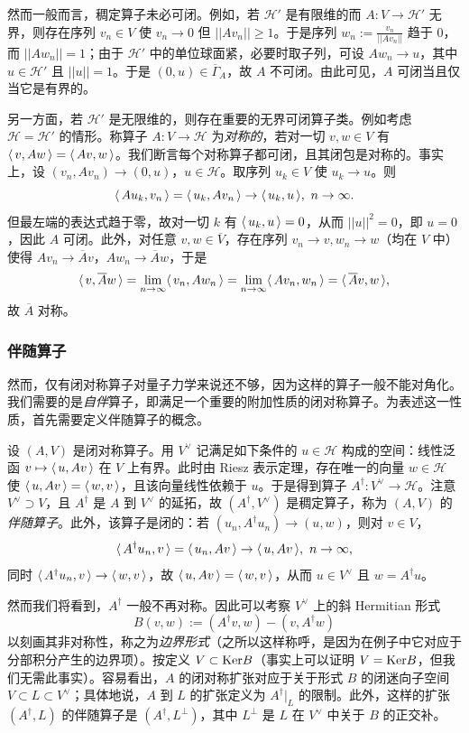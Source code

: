然而一般而言，稠定算子未必可闭。例如，若 $\mathcal H'$ 是有限维的而 $A: V\to \mathcal H'$ 无界，则存在序列 $v_n\in V$ 使 $v_n\to 0$ 但 $||Av_n||\ge 1$。于是序列 $w_n:=\frac{v_n}{||Av_n||}$ 趋于 $0$，而 $||Aw_n||=1$；由于 $\mathcal H'$ 中的单位球面紧，必要时取子列，可设 $Aw_n\to u$，其中 $u\in \mathcal H'$ 且 $||u||=1$。于是 $(0,u)\in \overline{\Gamma}_A$，故 $A$ 不可闭。由此可见，$A$ 可闭当且仅当它是有界的。

另一方面，若 $\mathcal H'$ 是无限维的，则存在重要的无界可闭算子类。例如考虑 $\mathcal H=\mathcal H'$ 的情形。称算子 $A: V\to \mathcal H$ 为\emph{对称的}，若对一切 $v,w\in V$ 有 $\langle\, v,Aw\,\rangle=\langle\, Av,w\,\rangle$。我们断言每个对称算子都可闭，且其闭包是对称的。事实上，设 $(v_n,Av_n)\to (0,u)$，$u\in\mathcal H$。取序列 $u_k\in V$ 使 $u_k\to u$。则
$$
\langle\, Au_k,v_n\,\rangle=\langle\, u_k,Av_n\,\rangle\to \langle\, u_k,u\,\rangle,\ n\to \infty.
$$
但最左端的表达式趋于零，故对一切 $k$ 有 $\langle\, u_k,u\,\rangle=0$，从而 $||u||^2=0$，即 $u=0$，因此 $A$ 可闭。此外，对任意 $v,w\in \overline V$，存在序列 $v_n\to v,w_n\to w$（均在 $V$ 中）使得 $Av_n\to \overline Av$，$Aw_n\to \overline Aw$，于是
$$
\langle\, v,\overline Aw\,\rangle=\lim_{n\to \infty}\langle\, v_n,Aw_n\,\rangle=\lim_{n\to \infty}\langle\, Av_n,w_n\,\rangle=\langle\, \overline Av,w\,\rangle,
$$
故 $\overline A$ 对称。

\subsubsection{伴随算子}
然而，仅有闭对称算子对量子力学来说还不够，因为这样的算子一般不能对角化。我们需要的是\emph{自伴}算子，即满足一个重要的附加性质的闭对称算子。为表述这一性质，首先需要定义伴随算子的概念。

设 $(A,V)$ 是闭对称算子。用 $V^\vee$ 记满足如下条件的 $u\in \mathcal H$ 构成的空间：线性泛函 $v\mapsto \langle\, u,Av\,\rangle$ 在 $V$ 上有界。此时由 Riesz 表示定理，存在唯一的向量 $w\in \mathcal H$ 使 $\langle\, u,Av\,\rangle=\langle\, w,v\,\rangle$，且该向量线性依赖于 $u$。于是得到算子 $A^\dagger: V^\vee\to \mathcal H$。注意 $V^\vee\supset V$，且 $A^\dagger$ 是 $A$ 到 $V^\vee$ 的延拓，故 $(A^\dagger,V^\vee)$ 是稠定算子，称为 $(A,V)$ 的\emph{伴随算子}。此外，该算子是闭的：若 $(u_n,A^\dagger u_n)\to (u,w)$，则对 $v\in V$，
$$
\langle\, A^\dagger u_n,v\,\rangle=\langle\, u_n,Av\,\rangle\to \langle\, u,Av\,\rangle,\ n\to \infty,
$$
同时 $\langle\, A^\dagger u_n,v\,\rangle\to \langle\, w,v\,\rangle$，故 $\langle\, u,Av\,\rangle=\langle\, w,v\,\rangle$，从而 $u\in V^\vee$ 且 $w=A^\dagger u$。

然而我们将看到，$A^\dagger$ 一般不再对称。因此可以考察 $V^\vee$ 上的斜 Hermitian 形式
$$
B(v,w):=(A^\dagger v,w)-(v,A^\dagger w)
$$
以刻画其非对称性，称之为\emph{边界形式}（之所以这样称呼，是因为在例子中它对应于分部积分产生的边界项）。按定义 $V\subset {\rm Ker}B$（事实上可以证明 $V={\rm Ker}B$，但我们无需此事实）。容易看出，$A$ 的闭对称扩张对应于关于形式 $B$ 的闭迷向子空间 $V\subset L\subset V^\vee$；具体地说，$A$ 到 $L$ 的扩张定义为 $A^\dagger|_L$ 的限制。此外，这样的扩张 $(A^\dagger,L)$ 的伴随算子是 $(A^\dagger, L^\perp)$，其中 $L^\perp$ 是 $L$ 在 $V^\vee$ 中关于 $B$ 的正交补。

